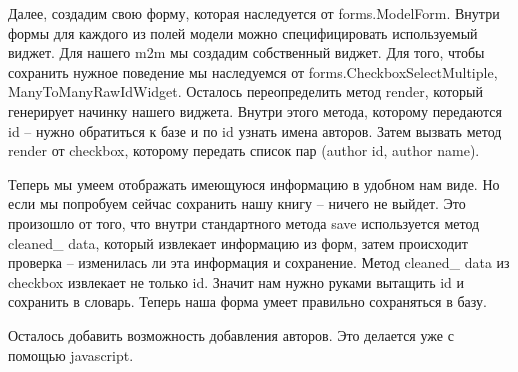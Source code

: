 \documentclass[a4paper]{report}
\begin{document}
Далее, создадим свою форму, которая наследуется от forms.ModelForm.
Внутри формы для каждого из полей модели можно специфицировать используемый 
виджет. Для нашего m2m мы создадим собственный виджет. Для того, чтобы сохранить 
нужное поведение мы наследуемся от forms.CheckboxSelectMultiple, 
ManyToManyRawIdWidget. Осталось переопределить метод render, который генерирует 
начинку нашего виджета. Внутри этого метода, которому передаются id -- нужно
обратиться к  базе и по id узнать имена авторов. Затем вызвать метод render
от checkbox, которому передать список пар (author id, author name).

Теперь мы умеем отображать имеющуюся информацию в удобном нам виде. Но если мы 
попробуем сейчас сохранить нашу книгу -- ничего не выйдет. Это произошло от того, 
что внутри стандартного метода save используется метод cleaned\_ data, который 
извлекает информацию из форм, затем происходит проверка -- изменилась ли эта 
информация и сохранение. Метод cleaned\_ data из checkbox извлекает не только id.
Значит нам нужно руками вытащить id и сохранить в словарь. Теперь наша форма
умеет правильно сохраняться в базу.

Осталось добавить возможность добавления авторов. Это делается уже с помощью 
javascript. 

 

\end{document}
